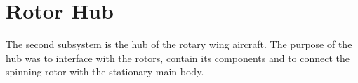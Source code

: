     \section{Rotor Hub}
    The second subsystem is the hub of the rotary wing aircraft. The purpose of the hub was to interface with the rotors, contain its components and to connect the spinning rotor with the stationary main body. 

